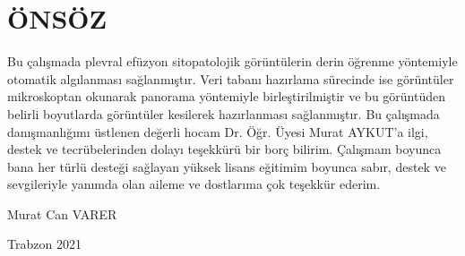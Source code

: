 \setlength{\parindent}{1cm}
\chapter*{ÖNSÖZ}

Bu çalışmada plevral efüzyon sitopatolojik görüntülerin derin öğrenme yöntemiyle
otomatik algılanması sağlanmıştır. Veri tabanı hazırlama sürecinde ise görüntüler mikroskoptan
okunarak panorama yöntemiyle birleştirilmiştir ve bu görüntüden belirli boyutlarda görüntüler
kesilerek hazırlanması sağlanmıştır. Bu çalışmada danışmanlığımı üstlenen değerli hocam Dr. Öğr. Üyesi Murat AYKUT'a ilgi, destek ve tecrübelerinden dolayı teşekkürü bir borç bilirim.
Çalışmam boyunca bana her türlü desteği sağlayan yüksek
lisans eğitimim boyunca sabır, destek ve sevgileriyle yanımda olan aileme ve dostlarıma çok
teşekkür ederim.

\vspace{1.5cm}
\hfill Murat Can VARER

\hfill Trabzon 2021

